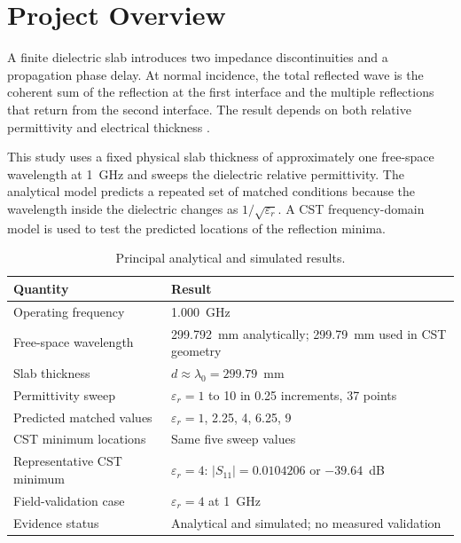 \section{Project Overview}
\label{sec:project-overview}

A finite dielectric slab introduces two impedance discontinuities and a propagation
phase delay. At normal incidence, the total reflected wave is the coherent sum of the
reflection at the first interface and the multiple reflections that return from the
second interface. The result depends on both relative permittivity and electrical
thickness \cite{balanis2012advanced,stutzman2013antenna}.

This study uses a fixed physical slab thickness of approximately one free-space
wavelength at 1~GHz and sweeps the dielectric relative permittivity. The analytical
model predicts a repeated set of matched conditions because the wavelength inside the
dielectric changes as $1/\sqrt{\varepsilon_r}$. A CST frequency-domain model is used
to test the predicted locations of the reflection minima.

\begin{table}[H]
\centering
\caption{Principal analytical and simulated results.}
\label{tab:principal-results}
\begin{tabularx}{\textwidth}{@{}>{\raggedright\arraybackslash}p{}X@{}}
\toprule
\textbf{Quantity} & \textbf{Result} \\
\midrule
Operating frequency & 1.000~GHz \\
Free-space wavelength & 299.792~mm analytically; 299.79~mm used in CST geometry \\
Slab thickness & $d\approx\lambda_0=299.79$~mm \\
Permittivity sweep & $\varepsilon_r=1$ to 10 in 0.25 increments, 37 points \\
Predicted matched values & $\varepsilon_r=1$, 2.25, 4, 6.25, 9 \\
CST minimum locations & Same five sweep values \\
Representative CST minimum & $\varepsilon_r=4$: $|S_{11}|=0.0104206$ or $-39.64$~dB \\
Field-validation case & $\varepsilon_r=4$ at 1~GHz \\
Evidence status & Analytical and simulated; no measured validation \\
\bottomrule
\end{tabularx}
\end{table}
